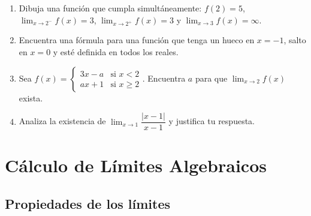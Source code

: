 \documentclass[12pt, a4paper]{article}
\begin{document}
\begin{enumerate}[leftmargin=*]
  \item \dificil{} Dibuja una función que cumpla simultáneamente: $f(2) = 5$, $\lim_{x \to 2^-} f(x) = 3$, $\lim_{x \to 2^+} f(x) = 3$ y $\lim_{x \to 3} f(x) = \infty$.

  \item \dificil{} Encuentra una fórmula para una función que tenga un hueco en $x = -1$, salto en $x = 0$ y esté definida en todos los reales.

  \item \dificil{} Sea $f(x) = \begin{cases} 3x - a & \text{si } x < 2 \\ ax + 1 & \text{si } x \ge 2 \end{cases}$. Encuentra $a$ para que $\lim_{x \to 2} f(x)$ exista.

  \item \dificil{} Analiza la existencia de $\lim_{x \to 1} \dfrac{|x - 1|}{x - 1}$ y justifica tu respuesta.
\end{enumerate}

\newpage

\section{Cálculo de Límites Algebraicos}

\subsection{Propiedades de los límites}
\end{document}
